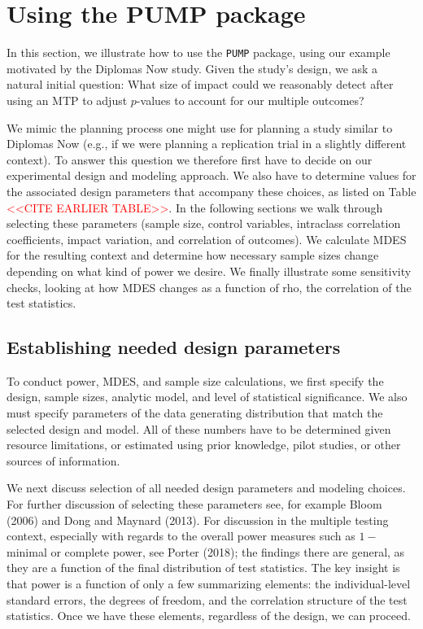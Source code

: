 \documentclass[
]{article}
\begin{document}
\section{Using the PUMP package}
\label{sec:vignette}

In this section, we illustrate how to use the \texttt{PUMP} package,
using our example motivated by the Diplomas Now study. Given the study's
design, we ask a natural initial question: What size of impact could we
reasonably detect after using an MTP to adjust \(p\)-values to account
for our multiple outcomes?

We mimic the planning process one might use for planning a study similar
to Diplomas Now (e.g., if we were planning a replication trial in a
slightly different context). To answer this question we therefore first
have to decide on our experimental design and modeling approach. We also
have to determine values for the associated design parameters that
accompany these choices, as listed on Table
\textcolor{red}{<<CITE EARLIER TABLE>>}. In the following sections we
walk through selecting these parameters (sample size, control variables,
intraclass correlation coefficients, impact variation, and correlation
of outcomes). We calculate MDES for the resulting context and determine
how necessary sample sizes change depending on what kind of power we
desire. We finally illustrate some sensitivity checks, looking at how
MDES changes as a function of rho, the correlation of the test
statistics.

\subsection{Establishing needed design parameters}

To conduct power, MDES, and sample size calculations, we first specify
the design, sample sizes, analytic model, and level of statistical
significance. We also must specify parameters of the data generating
distribution that match the selected design and model. All of these
numbers have to be determined given resource limitations, or estimated
using prior knowledge, pilot studies, or other sources of information.

We next discuss selection of all needed design parameters and modeling
choices. For further discussion of selecting these parameters see, for
example Bloom (2006) and Dong and Maynard (2013). For discussion in the
multiple testing context, especially with regards to the overall power
measures such as \(1-\)minimal or complete power, see Porter (2018); the
findings there are general, as they are a function of the final
distribution of test statistics. The key insight is that power is a
function of only a few summarizing elements: the individual-level
standard errors, the degrees of freedom, and the correlation structure
of the test statistics. Once we have these elements, regardless of the
design, we can proceed.
\end{document}
